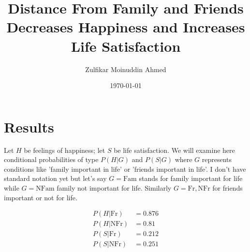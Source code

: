 \documentclass{amsart}
\title{Distance From Family and Friends Decreases Happiness and Increases Life Satisfaction}
\author{Zulfikar Moinuddin Ahmed}
\date{\today}
\begin{document}
\maketitle


\section{Results}

Let $H$ be feelings of happiness; let $S$ be life satisfaction.  We will examine here conditional probabilities of type $P(H| G)$ and $P(S| G)$ where $G$ represents conditions like 'family important in life' or 'friends important in life'.  I don't have standard notation yet but let's say
$G=\mathrm{Fam}$ stands for family important for life while $G=\mathrm{NFam}$ family not important for life.  Similarly $G=\mathrm{Fr},\mathrm{NFr}$ for friends important or not for life.

\begin{align*}
P(H|\mathrm{Fr}) &= 0.876\\
P(H|\mathrm{NFr}) &= 0.81 \\
P(S|\mathrm{Fr}) &= 0.212
\\
P(S|\mathrm{NFr}) &= 0.251 
\end{align*}
\end{document}
